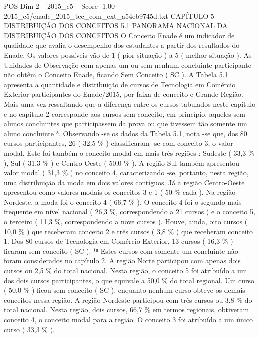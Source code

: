 \begin{textsample}{POS Dim 2 – 2015\_c5 – Score -1.00 – 2015\_c5/enade\_2015\_tec\_com\_ext\_a54eb9745d.txt}  \label{ex:f2_pos_283}
CAPÍTULO 5 DISTRIBUIÇÃO DOS CONCEITOS 5.1 PANORAMA NACIONAL DA DISTRIBUIÇÃO DOS CONCEITOS O Conceito Enade é um indicador de qualidade que avalia o desempenho dos estudantes a partir dos resultados do Enade.
Os valores possíveis vão de 1 ( pior situação ) a 5 ( melhor situação ).
As Unidades de Observação com apenas um ou sem nenhum concluinte participante não obtêm o Conceito Enade, ficando Sem Conceito ( SC ).
A Tabela 5.1 apresenta a quantidade e distribuição de cursos de Tecnologia em Comércio Exterior participantes do Enade/2015, por faixa de conceito e Grande Região.
Mais uma vez ressaltando que a diferença entre os cursos tabulados neste capítulo e no capítulo 2 corresponde aos cursos sem conceito, em princípio, aqueles sem alunos concluintes que participassem da prova ou que tivessem tão somente um aluno concluinte¹⁸.
Observando -se os dados da Tabela 5.1, nota -se que, dos 80 cursos participantes, 26 ( 32,5 \% ) classificaram -se com conceito 3, o valor modal.
Este foi também o conceito modal em mais três regiões : Sudeste ( 33,3 \% ), Sul ( 31,3 \% ) e Centro-Oeste ( 50,0 \% ).
A região Sul também apresentou valor modal ( 31,3 \% ) no conceito 4, caracterizando -se, portanto, nesta região, uma distribuição da moda em dois valores contíguos.
Já a região Centro-Oeste apresentou como valores modais os conceitos 3 e 1 ( 50 \% cada ).
Na região Nordeste, a moda foi o conceito 4 ( 66,7 \% ).
O conceito 4 foi o segundo mais frequente em nível nacional ( 26,3 \%, correspondendo a 21 cursos ) e o conceito 5, o terceiro ( 11,3 \%, correspondendo a nove cursos ).
Houve, ainda, oito cursos ( 10,0 \% ) que receberam conceito 2 e três cursos ( 3,8 \% ) que receberam conceito 1.
Dos 80 cursos de Tecnologia em Comércio Exterior, 13 cursos ( 16,3 \% ) ficaram sem conceito ( SC ). ¹⁸ Estes cursos com somente um concluinte não foram considerados no capítulo 2.
A região Norte participou com apenas dois cursos ou 2,5 \% do total nacional.
Nesta região, o conceito 5 foi atribuído a um dos dois cursos participantes, o que equivale a 50,0 \% do total regional.
Um curso ( 50,0 \% ) ficou sem conceito ( SC ), enquanto nenhum curso obteve os demais conceitos nessa região.
A região Nordeste participou com três cursos ou 3,8 \% do total nacional.
Nesta região, dois cursos, 66,7 \% em termos regionais, obtiveram conceito 4, o conceito modal para a região.
O conceito 3 foi atribuído a um único curso ( 33,3 \% ).

\end{textsample}
